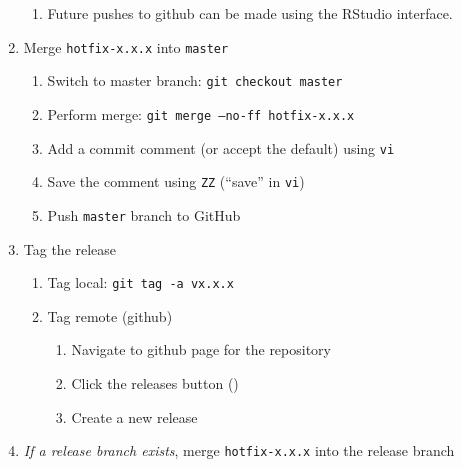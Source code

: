 \documentclass{article}
\begin{document}
\begin{enumerate}
\begin{enumerate}
  	\item Future pushes to github can be made using the RStudio interface.

  \end{enumerate}
  \item Merge \texttt{hotfix-x.x.x} into \texttt{master}  
  \begin{enumerate}

    \item Switch to master branch: \texttt{git checkout master} 
	
    \item Perform merge: \texttt{git merge --no-ff hotfix-x.x.x} 
	
	\item Add a commit comment (or accept the default) using \texttt{vi} 
	
	\item Save the comment using \texttt{ZZ} (``save'' in \texttt{vi})
	
	\item Push \texttt{master} branch to GitHub 

  \end{enumerate}
  \item Tag the release
  \begin{enumerate}

    \item Tag local: \texttt{git tag -a vx.x.x}

    \item Tag remote (github)
	\begin{enumerate}

	  \item Navigate to github page for the repository

	  \item Click the releases button ()
	  
	  \item Create a new release

	\end{enumerate}
  \end{enumerate}
  
  \item \emph{If a release branch exists}, 
  		merge \texttt{hotfix-x.x.x} into the release branch
  \begin{enumerate}


\end{enumerate}
\end{enumerate}
\end{document}
